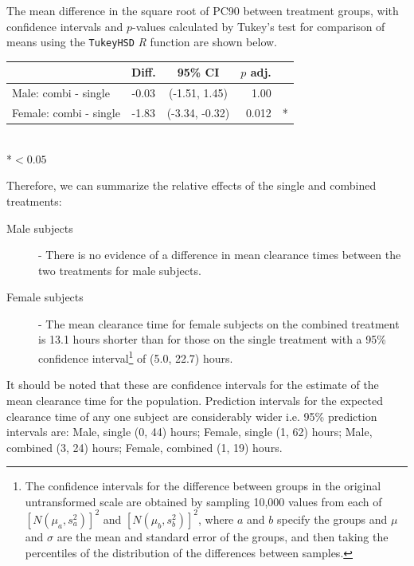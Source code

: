 The mean difference in the square root of PC90 between treatment groups, with confidence intervals and $p$-values calculated by Tukey's test for comparison of means \cite{montgomery} using the \texttt{TukeyHSD} \emph{R} function are shown below.
\begin{table}[h]
\centering
\begin{tabular}{l|ccrl}
&Diff.&95\% CI&$p$ adj.&\\
\hline
Male: combi - single 	& -0.03 & (-1.51, 1.45) & 1.00 &\\
Female: combi - single	& -1.83 & (-3.34,  -0.32) & 0.012 &*\\
\end{tabular}\\
*$<0.05$
\end{table}

Therefore, we can summarize the relative effects of the single and combined treatments:
\begin{description}
\item[Male subjects] - There is no evidence of a difference in mean clearance times between the two treatments for male subjects.
\item[Female subjects] - The mean clearance time for female subjects on the combined treatment is 13.1 hours shorter than for those on the single treatment with a 95\% confidence interval\footnote{The confidence intervals for the difference between groups in the original untransformed scale are obtained by sampling 10,000 values from each of $[N(\mu_{a},s_{a}^{2})]^{2}$ and $[N(\mu_{b},s_{b}^{2})]^{2}$, where $a$ and $b$ specify the groups and $\mu$ and $\sigma$ are the mean and standard error of the groups, and then taking the percentiles of the distribution of the differences between samples.} of (5.0, 22.7) hours.
\end{description}
It should be noted that these are confidence intervals for the estimate of the mean clearance time for the population. Prediction intervals for the expected clearance time of any one subject are considerably wider i.e. 95\% prediction intervals are: Male, single (0, 44) hours; Female, single (1, 62) hours; Male, combined (3, 24) hours; Female, combined (1, 19) hours.

